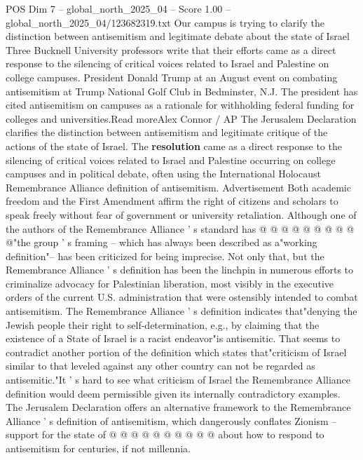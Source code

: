 \begin{textsample}{POS Dim 7 – global\_north\_2025\_04 – Score 1.00 – global\_north\_2025\_04/123682319.txt}  \label{ex:f7_pos_357}
Our campus is trying to clarify the distinction between antisemitism and legitimate debate about the state of Israel Three Bucknell University professors write that their efforts came as a direct response to the silencing of critical voices related to Israel and Palestine on college campuses.
President Donald Trump at an August event on combating antisemitism at Trump National Golf Club in Bedminster, N.J.
The president has cited antisemitism on campuses as a rationale for withholding federal funding for colleges and universities.Read moreAlex Connor / AP The Jerusalem Declaration clarifies the distinction between antisemitism and legitimate critique of the actions of the state of Israel.
The \textbf{resolution} came as a direct response to the silencing of critical voices related to Israel and Palestine occurring on college campuses and in political debate, often using the International Holocaust Remembrance Alliance definition of antisemitism.
Advertisement Both academic freedom and the First Amendment affirm the right of citizens and scholars to speak freely without fear of government or university retaliation.
Although one of the authors of the Remembrance Alliance ' s standard has @ @ @ @ @ @ @ @ @ @"the group ' s framing -- which has always been described as a"working definition"-- has been criticized for being imprecise.
Not only that, but the Remembrance Alliance ' s definition has been the linchpin in numerous efforts to criminalize advocacy for Palestinian liberation, most visibly in the executive orders of the current U.S. administration that were ostensibly intended to combat antisemitism.
The Remembrance Alliance ' s definition indicates that"denying the Jewish people their right to self-determination, e.g., by claiming that the existence of a State of Israel is a racist endeavor"is antisemitic.
That seems to contradict another portion of the definition which states that"criticism of Israel similar to that leveled against any other country can not be regarded as antisemitic."It ' s hard to see what criticism of Israel the Remembrance Alliance definition would deem permissible given its internally contradictory examples.
The Jerusalem Declaration offers an alternative framework to the Remembrance Alliance ' s definition of antisemitism, which dangerously conflates Zionism -- support for the state of @ @ @ @ @ @ @ @ @ @ about how to respond to antisemitism for centuries, if not millennia.

\end{textsample}
